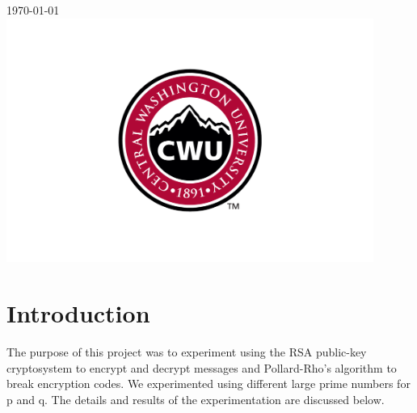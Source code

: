 \documentclass[12pt]{article}
\begin{document}
\begin{titlepage}
		
		
		{\large \today}\\ %
		
		
		\includegraphics[width=12cm]{CWU-Logo.png}\\[.5cm] %
		
		
		\vfill %
		
	\end{titlepage}
	\newpage
	\tableofcontents
	\newpage
	
	
	
	\section{Introduction}
		The purpose of this project was to experiment using the RSA public-key cryptosystem to encrypt and decrypt messages and Pollard-Rho's algorithm to break encryption codes. We experimented using different large prime numbers for p and q. The details and results of the experimentation are discussed below. 
\end{document}
